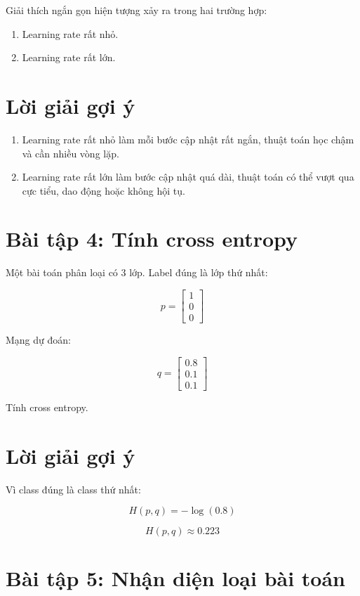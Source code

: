 \documentclass[12pt,a4paper]{report}
\begin{document}
Giải thích ngắn gọn hiện tượng xảy ra trong hai trường hợp:

\begin{enumerate}
    \item Learning rate rất nhỏ.
    \item Learning rate rất lớn.
\end{enumerate}

\section*{Lời giải gợi ý}

\begin{enumerate}
    \item Learning rate rất nhỏ làm mỗi bước cập nhật rất ngắn, thuật toán học chậm và cần nhiều vòng lặp.
    \item Learning rate rất lớn làm bước cập nhật quá dài, thuật toán có thể vượt qua cực tiểu, dao động hoặc không hội tụ.
\end{enumerate}

\section*{Bài tập 4: Tính cross entropy}

Một bài toán phân loại có 3 lớp. Label đúng là lớp thứ nhất:

\[
    p =
    \begin{bmatrix}
    1\\0\\0
    \end{bmatrix}
\]

Mạng dự đoán:

\[
    q =
    \begin{bmatrix}
    0.8\\0.1\\0.1
    \end{bmatrix}
\]

Tính cross entropy.

\section*{Lời giải gợi ý}

Vì class đúng là class thứ nhất:

\[
    H(p,q)=-\log(0.8)
\]

\[
    H(p,q)\approx 0.223
\]

\section*{Bài tập 5: Nhận diện loại bài toán}
\end{document}
